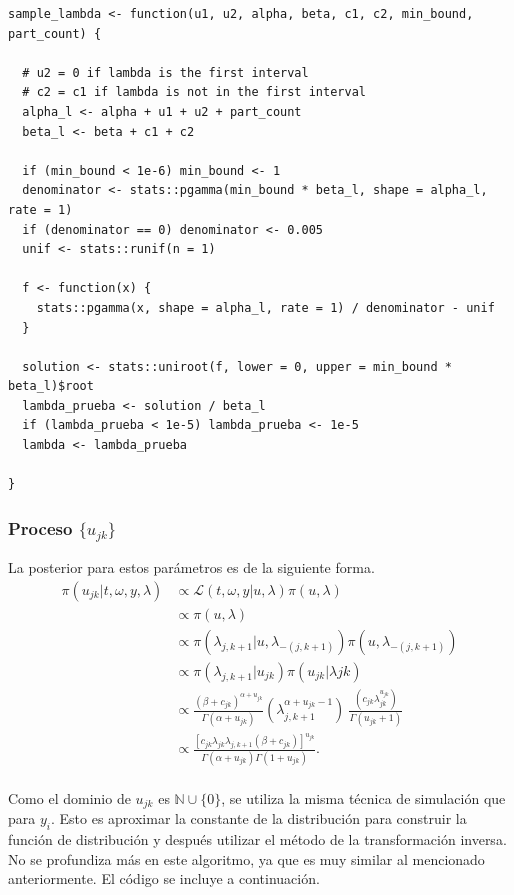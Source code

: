 \documentclass[11pt,a4paper]{article}
\begin{document}
\begin{lstlisting}
sample_lambda <- function(u1, u2, alpha, beta, c1, c2, min_bound, part_count) {

  # u2 = 0 if lambda is the first interval
  # c2 = c1 if lambda is not in the first interval
  alpha_l <- alpha + u1 + u2 + part_count
  beta_l <- beta + c1 + c2

  if (min_bound < 1e-6) min_bound <- 1
  denominator <- stats::pgamma(min_bound * beta_l, shape = alpha_l, rate = 1)
  if (denominator == 0) denominator <- 0.005
  unif <- stats::runif(n = 1)

  f <- function(x) {
    stats::pgamma(x, shape = alpha_l, rate = 1) / denominator - unif
  }

  solution <- stats::uniroot(f, lower = 0, upper = min_bound * beta_l)$root
  lambda_prueba <- solution / beta_l
  if (lambda_prueba < 1e-5) lambda_prueba <- 1e-5
  lambda <- lambda_prueba

}
\end{lstlisting}\leavevmode\newline

\subsubsection*{Proceso $\lbrace u_{jk}\rbrace$}

La posterior para estos parámetros es de la siguiente forma.
\begin{align*}
\pi(u_{jk} | t, \omega, y ,\lambda) &\propto \mathcal{L}(t, \omega, y | u, \lambda) \pi(u, \lambda)\\
&\propto \pi(u, \lambda)\\
&\propto \pi(\lambda_{j, k+1} | u, \lambda_{-(j, k+1)}) \pi(u, \lambda_{-(j, k+1)})\\
&\propto \pi(\lambda_{j, k+1} | u_{jk}) \pi(u_{jk}|\lambda{jk})\\
&\propto \frac{(\beta + c_{jk})^{\alpha + u_{jk}}}{\Gamma(\alpha + u_{jk})} \left(\lambda_{j, k+1}^{\alpha + u_{jk}-1}\right) \ \frac{\left(c_{jk}\lambda_{jk}^{u_{jk}}\right)}{\Gamma(u_{jk}+1)}\\
&\propto \frac{\left[c_{jk}\lambda_{jk}\lambda_{j, k+1}(\beta + c_{jk})\right]^{u_{jk}}}{\Gamma(\alpha + u_{jk})\Gamma(1 + u_{jk})}.\\
\end{align*}

Como el dominio de $u_{jk}$ es $\mathbb{N}\cup \lbrace 0 \rbrace$, se utiliza la misma técnica de simulación que para $y_i$. Esto es aproximar la constante de la distribución para construir la función de distribución y después utilizar el método de la transformación inversa. No se profundiza más en este algoritmo, ya que es muy similar al mencionado anteriormente. El código se incluye a continuación.\\
\end{document}
